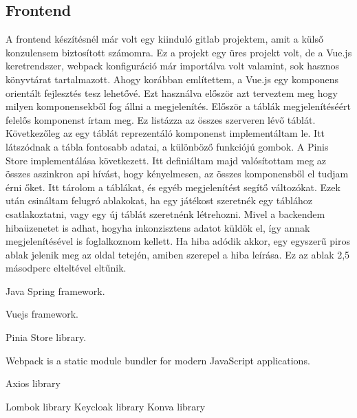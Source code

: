 \documentclass[a4paper,twoside]{article}
\begin{document}
\subsection{Frontend}
A frontend készítésnél már volt egy kiinduló gitlab projektem, amit a külső konzulensem
biztosított számomra. Ez a projekt egy üres projekt volt, de a Vue.js keretrendszer, webpack
konfiguráció már importálva volt valamint, sok hasznos könyvtárat tartalmazott. Ahogy
korábban említettem, a Vue.js egy komponens orientált fejlesztés tesz lehetővé. Ezt használva
először azt terveztem meg hogy milyen komponensekből fog állni a megjelenítés.
Először a táblák megjelenítéséért felelős komponenst írtam meg. Ez listázza az összes
szerveren lévő táblát.
Következőleg az egy táblát reprezentáló komponenst implementáltam le. Itt látszódnak a tábla
fontosabb adatai, a különböző funkciójú gombok.
A Pinis Store implementálása következett. Itt definiáltam majd valósítottam meg az összes
aszinkron api hívást, hogy kényelmesen, az összes komponensből el tudjam érni őket. Itt
tárolom a táblákat, és egyéb megjelenítést segítő változókat.
Ezek után csináltam felugró ablakokat, ha egy játékost szeretnék egy táblához csatlakoztatni,
vagy egy új táblát szeretnénk létrehozni.
Mivel a backendem hibaüzenetet is adhat, hogyha inkonzisztens adatot küldök el, így annak
megjelenítésével is foglalkoznom kellett. Ha hiba adódik akkor, egy egyszerű piros ablak
jelenik meg az oldal tetején, amiben szerepel a hiba leírása. Ez az ablak 2,5 másodperc
elteltével eltűnik.



\newpage
\begin{thebibliography}{9}
	Java Spring framework.
	
	Vuejs framework.
	
	Pinia Store library.
	
	 Webpack is a static module bundler for modern JavaScript applications.
	 
	 Axios library
	 
	 Lombok library
	 Keycloak library
	 Konva library
\end{thebibliography}
\end{document}
